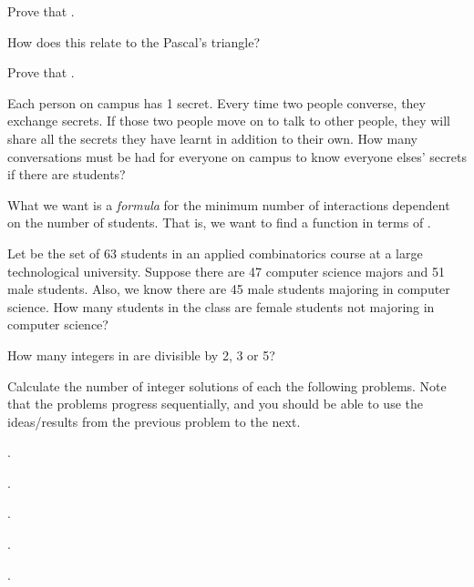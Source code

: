 \startchapter [title={Exercises}]

	\startsection [title={2019-06-12}]
		
		\startexercise [title={recursion formula for binomial coefficients}]
			Prove that .

			How does this relate to the Pascal's triangle?
		\stopexercise

		\startexercise [title={sum of binomial coefficients}]
			Prove that .
		\stopexercise
		
		\startexercise [title={variation of the handshake problem}]
			Each person on campus has 1 secret. Every time two people converse, they exchange secrets. If those two people move on to talk to other people, they will share all the secrets they have learnt in addition to their own. How many conversations must be had for everyone on campus to know everyone elses' secrets if there are  students?

			What we want is a \emph{formula} for the minimum number of interactions dependent on the number of students. That is, we want to find a function  in terms of .
		\stopexercise

		\startexercise [title={Venn diagrams}]
			Let  be the set of 63 students in an applied combinatorics course at a large technological university. Suppose there are 47 computer science majors and 51 male students. Also, we know there are 45 male students majoring in computer science. How many students in the class are female students not majoring in computer science?
		\stopexercise

		\startexercise [title={counting integers}]
			How many integers in \m{\bcrl[1, ⋯, 100]} are divisible by 2, 3 or 5?
		\stopexercise

		\startexercise [title={stars and bars problems}]
			Calculate the number of integer solutions of each the following problems. Note that the problems progress sequentially, and you should be able to use the ideas/results from the previous problem to the next.
			\startitemize [m, joinedup]
				\item  {}.
				\item  {}.
				\item  {}.
				\item  {}.
				\item  {}.
			\stopitemize
		\stopexercise

	\stopsection


\stopchapter